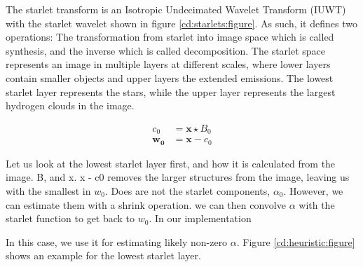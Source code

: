 The starlet transform is an Isotropic Undecimated Wavelet Transform (IUWT) with the starlet wavelet shown in figure \ref{cd:starlets:figure}. As such, it defines two operations: The transformation from starlet into image space which is called synthesis, and the inverse which is called decomposition. The starlet space represents an image in multiple layers at different scales, where lower layers contain smaller objects and upper layers the extended emissions. The lowest starlet layer represents the stars, while the upper layer represents the largest hydrogen clouds in the image.

\begin{equation}\label{cd:starlet:w0}
\begin{aligned}
	c_0 &= \bm{x} \star B_0 \\
	\bm{w_0} &= \bm{x} - c_0
\end{aligned}
\end{equation}

Let us look at the lowest starlet layer first, and how it is calculated from the image.
B, and x.
x - c0 removes the larger structures from the image, leaving us with the smallest in $w_0$. Does are not the starlet components, $\alpha_0$. However, we can estimate them with a shrink operation.
we can then convolve $\alpha$ with the starlet function to get back to $w_0$.  In our implementation


In this case, we use it for estimating likely non-zero $\alpha$. Figure \ref{cd:heuristic:figure} shows an example for the lowest starlet layer.

